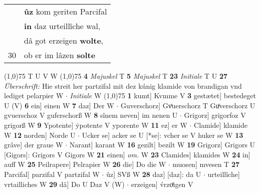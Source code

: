 \documentclass[8pt,a4paper,notitlepage]{article}
\begin{document}
\begin{table}[ht]
\begin{minipage}[t]{0.5\linewidth}
\begin{tabular}{rl}
 & \textbf{ûz} kom geriten Parcifal\\ 
 & \textbf{in} daz urteillîche wal,\\ 
 & dâ got erzeigen \textbf{wolte},\\ 
30 & ob er im lâzen \textbf{solte}\\ 
\end{tabular}
\scriptsize
\line(1,0){75} \newline
T U V W \newline
\line(1,0){75} \newline
\textbf{4} \textit{Majuskel} T  \textbf{5} \textit{Majuskel} T  \textbf{23} \textit{Initiale} T U  \textbf{27} \textit{Überschrift:} Hie streit her partzifal mit dez kúnig klamide von brandigan vnd lediget pelarpier W   $\cdot$ \textit{Initiale} W  \newline
\line(1,0){75} \newline
\textbf{1} kumt] Kvmme V \textbf{3} gestætet] bestedeget U (V) \textbf{6} ein] einen W \textbf{7} daz] Der W  $\cdot$ Guverschorz] Gvͤuerschorz T Guͦverschorz U gvuerschoz V guferschorß W \textbf{8} sînem neven] im nenen U  $\cdot$ Grigorz] grigorfoz V grigorß W \textbf{9} Ypotente] ẏpotente V yporente W \textbf{11} ez] er W  $\cdot$ Clamide] klamide W \textbf{12} norden] Norde U  $\cdot$ Ucker se] acker se U [*se]: vcher se V huker se W \textbf{13} grâve] der graue W  $\cdot$ Narant] karant W \textbf{16} gezilt] bezilt W \textbf{19} Grigorz] Grigors U [Gigors]: Grigors V Gigors W \textbf{21} einen] \textit{om.} W \textbf{23} Clamides] klamides W \textbf{24} in] auff W \textbf{25} Peilrapere] Pelrapier W \textbf{26} die] Do die W  $\cdot$ muosen] mvesen T \textbf{27} Parcifal] parzifal V partzifal W  $\cdot$ ûz] SVß W \textbf{28} daz] [daz]: da U  $\cdot$ urteillîche] vrtailliches W \textbf{29} dâ] Do U Daz V (W)  $\cdot$ erzeigen] v́rzoͤigen V \newline
\end{minipage}
\end{table}
\end{document}
